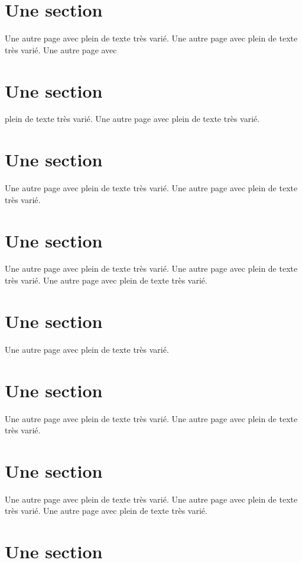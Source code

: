 \documentclass[11pt]{thesul}
\begin{document}
\section{Une section}

Une autre page avec plein de texte très varié.
Une autre page avec plein de texte très varié.
Une autre page avec


\section{Une section}

plein de texte très varié.
Une autre page avec plein de texte très varié.

\section{Une section}

Une autre page avec plein de texte très varié.
Une autre page avec plein de texte très varié.

\section{Une section}

Une autre page avec plein de texte très varié.
Une autre page avec plein de texte très varié.
Une autre page avec plein de texte très varié.

\section{Une section}

Une autre page avec plein de texte très varié.

\section{Une section}

Une autre page avec plein de texte très varié.
Une autre page avec plein de texte très varié.

\section{Une section}

Une autre page avec plein de texte très varié.
Une autre page avec plein de texte très varié.
Une autre page avec plein de texte très varié.

\section{Une section}
\end{document}
